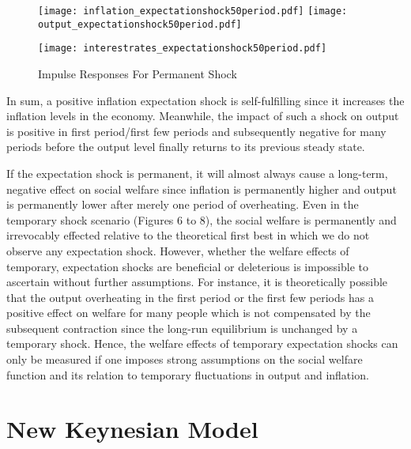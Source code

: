 \documentclass[12pt]{article}
\newcommand{\1}{\mathbbm 1}
\begin{document}
	
	\begin{figure}[H]
		\texttt{[image: inflation\_expectationshock50period.pdf]}
		\hfill
		\texttt{[image: output\_expectationshock50period.pdf]}
		\hfill
		\begin{Center}
			\texttt{[image: interestrates\_expectationshock50period.pdf]}
		\end{Center}
		\caption{Impulse Responses For Permanent Shock}
	\end{figure}


In sum, a positive inflation expectation shock is self-fulfilling since it increases the inflation levels in the economy. Meanwhile, the impact of such a shock on output is positive in first period/first few periods and subsequently negative for many periods before the output level finally returns to its previous steady state. 


If the expectation shock is permanent, it will almost always cause a long-term, negative effect on social welfare since inflation is permanently higher and output is permanently lower after merely one period of overheating. Even in the temporary shock scenario (Figures 6 to 8), the social welfare is permanently and irrevocably effected relative to the theoretical first best in which we do not observe any expectation shock. However, whether the welfare effects of temporary, expectation shocks are beneficial or deleterious is impossible to ascertain without further assumptions. For instance, it is theoretically possible that the output overheating in the first period or the first few periods has a positive effect on welfare for many people which is not compensated by the subsequent contraction since the long-run equilibrium is unchanged by a temporary shock. Hence, the welfare effects of temporary expectation shocks can only be measured if one imposes strong assumptions on the social welfare function and its relation to temporary fluctuations in output and inflation.













		
		
			
		
		\section{New Keynesian Model}
		
\end{document}
